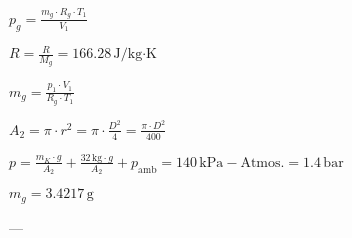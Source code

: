 \( p_g = \frac{m_g \cdot R_g \cdot T_1}{V_1} \)  

\( R = \frac{R}{M_g} = 166.28 \, \text{J/kg·K} \)  

\( m_g = \frac{p_1 \cdot V_1}{R_g \cdot T_1} \)  

\( A_2 = \pi \cdot r^2 = \pi \cdot \frac{D^2}{4} = \frac{\pi \cdot D^2}{400} \)  

\( p = \frac{m_K \cdot g}{A_2} + \frac{32 \, \text{kg} \cdot g}{A_2} + p_{\text{amb}} = 140 \, \text{kPa} - \text{Atmos.} = 1.4 \, \text{bar} \)  

\( m_g = 3.4217 \, \text{g} \)  

---